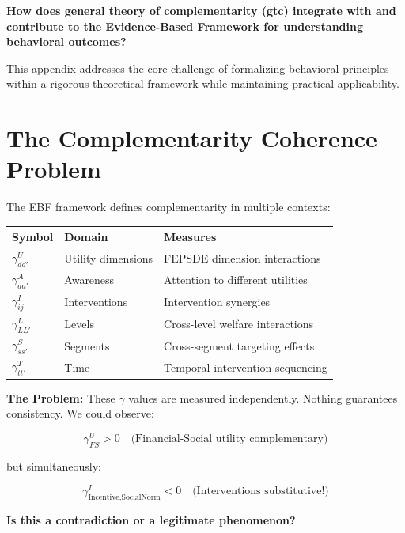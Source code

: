 \begin{tcolorbox}[
    colback=red!5!white,
    colframe=red!75!black,
    title={\textbf{Fundamental Question}}
]
\textbf{How does general theory of complementarity (gtc) integrate with and contribute to the
Evidence-Based Framework for understanding behavioral outcomes?}

This appendix addresses the core challenge of formalizing behavioral principles
within a rigorous theoretical framework while maintaining practical applicability.
\end{tcolorbox}





\section{The Complementarity Coherence Problem}
\label{sec:gtc-problem}

\begin{tcolorbox}[colback=red!5!white, colframe=red!75!black,
    title=The Fundamental Problem]

The EBF framework defines complementarity in multiple contexts:

\begin{center}
\renewcommand{\arraystretch}{1.3}
\begin{tabular}{lll}
\textbf{Symbol} & \textbf{Domain} & \textbf{Measures} \\
\hline
$\gamma^U_{dd'}$ & Utility dimensions & FEPSDE dimension interactions \\
$\gamma^A_{aa'}$ & Awareness & Attention to different utilities \\
$\gamma^I_{ij}$ & Interventions & Intervention synergies \\
$\gamma^L_{LL'}$ & Levels & Cross-level welfare interactions \\
$\gamma^S_{ss'}$ & Segments & Cross-segment targeting effects \\
$\gamma^T_{tt'}$ & Time & Temporal intervention sequencing \\
\end{tabular}
\end{center}

\textbf{The Problem:} These $\gamma$ values are measured independently. Nothing
guarantees consistency. We could observe:

\begin{equation}
\gamma^U_{FS} > 0 \quad \text{(Financial-Social utility complementary)}
\end{equation}

but simultaneously:

\begin{equation}
\gamma^I_{\text{Incentive}, \text{SocialNorm}} < 0 \quad \text{(Interventions substitutive!)}
\end{equation}

\textbf{Is this a contradiction or a legitimate phenomenon?}

\end{tcolorbox}


